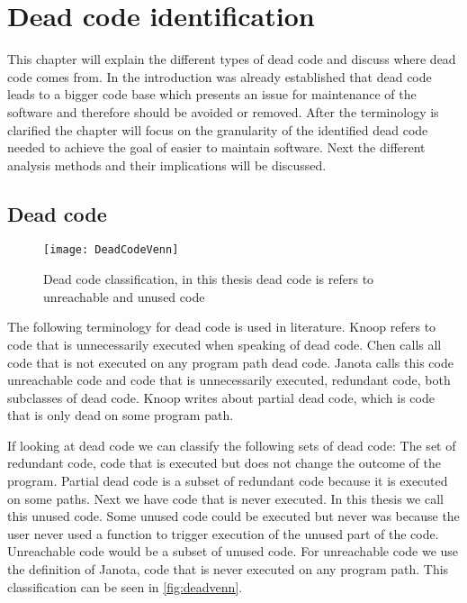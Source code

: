 \chapter{Dead code identification}
\label{ch:identification}


This chapter will explain the different types of dead code and discuss where dead code comes from. In the introduction was already established that dead code leads to a bigger code base which presents an issue for maintenance of the software and therefore should be avoided or removed. After the terminology is clarified the chapter will focus on the granularity of the identified dead code needed to achieve the goal of easier to maintain software. Next the different analysis methods and their implications will be discussed.

\section{Dead code}
\label{sec:dead}

\begin{figure}
	\center
	\texttt{[image: DeadCodeVenn]}
	\caption{\label{fig:deadvenn}Dead code classification, in this thesis dead code is refers to unreachable and unused code}
\end{figure}

The following terminology for dead code is used in literature. 
Knoop\cite{knoop1994} refers to code that is unnecessarily executed when speaking of dead code. Chen\cite{chen1998} calls all code that is not executed on any program path dead code. Janota\cite{janota2007} calls this code unreachable code and code that is unnecessarily executed, redundant code, both subclasses of dead code. Knoop\cite{knoop1994} writes about partial dead code, which is code that is only dead on some program path. 

If looking at dead code we can classify the following sets of dead code: The set of redundant code, code that is executed but does not change the outcome of the program. Partial dead code is a subset of redundant code because it is executed on some paths. Next we have code that is never executed. In this thesis we call this unused code. Some unused code could be executed but never was because the user never used a function to trigger execution of the unused part of the code. Unreachable code would be a subset of unused code. For unreachable code we use the definition of Janota\cite{janota2007}, code that is never executed on any program path. This classification can be seen in \autoref{fig:deadvenn}.

